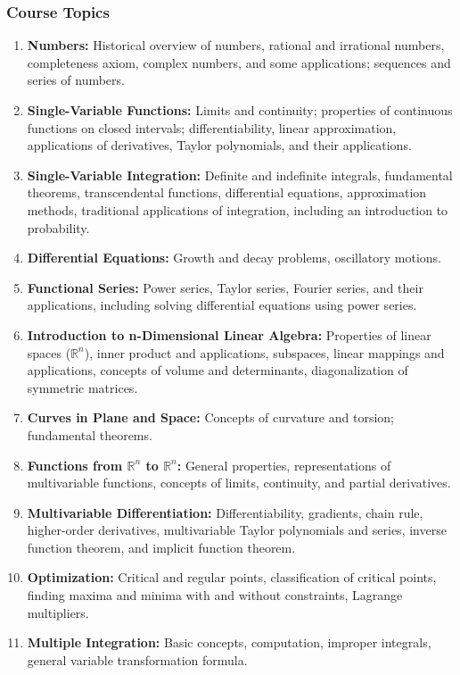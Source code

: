 \documentclass[12pt]{article}
\begin{document}
\subsubsection*{Course Topics}
\begin{enumerate}
    \item \textbf{Numbers:} Historical overview of numbers, rational and irrational numbers, completeness axiom, complex numbers, and some applications; sequences and series of numbers.
    \item \textbf{Single-Variable Functions:} Limits and continuity; properties of continuous functions on closed intervals; differentiability, linear approximation, applications of derivatives, Taylor polynomials, and their applications.
    \item \textbf{Single-Variable Integration:} Definite and indefinite integrals, fundamental theorems, transcendental functions, differential equations, approximation methods, traditional applications of integration, including an introduction to probability.
    \item \textbf{Differential Equations:} Growth and decay problems, oscillatory motions.
    \item \textbf{Functional Series:} Power series, Taylor series, Fourier series, and their applications, including solving differential equations using power series.
    \item \textbf{Introduction to n-Dimensional Linear Algebra:} Properties of linear spaces (\( \mathbb{R}^n \)), inner product and applications, subspaces, linear mappings and applications, concepts of volume and determinants, diagonalization of symmetric matrices.
    \item \textbf{Curves in Plane and Space:} Concepts of curvature and torsion; fundamental theorems.
    \item \textbf{Functions from \( \mathbb{R}^n \) to \( \mathbb{R}^n \):} General properties, representations of multivariable functions, concepts of limits, continuity, and partial derivatives.
    \item \textbf{Multivariable Differentiation:} Differentiability, gradients, chain rule, higher-order derivatives, multivariable Taylor polynomials and series, inverse function theorem, and implicit function theorem.
    \item \textbf{Optimization:} Critical and regular points, classification of critical points, finding maxima and minima with and without constraints, Lagrange multipliers.
    \item \textbf{Multiple Integration:} Basic concepts, computation, improper integrals, general variable transformation formula.

\end{enumerate}
\end{document}
